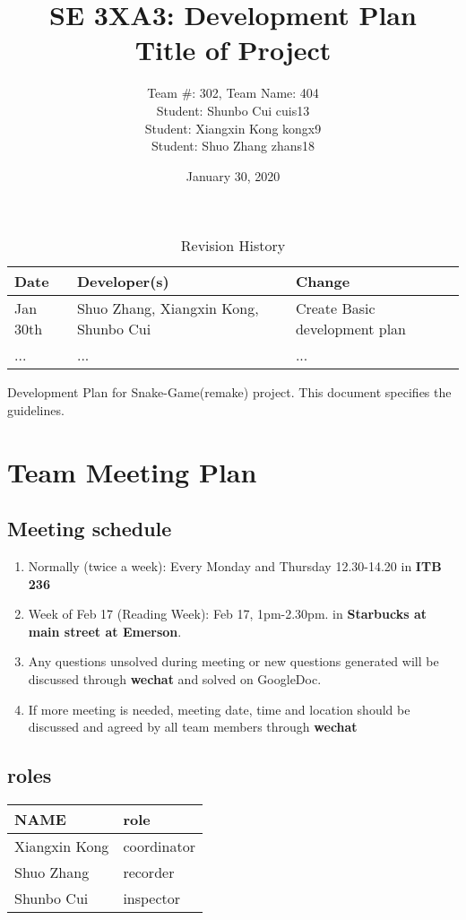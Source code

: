\documentclass{article}
\title{SE 3XA3: Development Plan\\Title of Project}
\author{Team \#: 302, Team Name: 404
		\\ Student: Shunbo Cui	cuis13
		\\ Student: Xiangxin Kong	kongx9
		\\ Student: Shuo Zhang	zhans18
}
\date{January 30, 2020}
\begin{document}
\begin{table}[hp]
\caption{Revision History} \label{TblRevisionHistory}
\begin{tabularx}{\textwidth}{llX}
\toprule
\textbf{Date} & \textbf{Developer(s)} & \textbf{Change}\\
\midrule
Jan 30th & Shuo Zhang, Xiangxin Kong, Shunbo Cui & Create Basic development plan\\
... & ... & ...\\
\bottomrule
\end{tabularx}
\end{table}

\newpage

\maketitle

Development Plan for Snake-Game(remake) project. This document specifies the guidelines.

\section{Team Meeting Plan}
\subsection{Meeting schedule}
\begin{enumerate}
    \item Normally (twice a week): Every Monday and Thursday  12.30-14.20 in \textbf{ITB 236}
    \item Week of Feb 17 (Reading Week): Feb 17, 1pm-2.30pm. in \textbf{Starbucks at main street at Emerson}.
	\item Any questions unsolved during meeting or new questions generated will be discussed through \textbf{wechat} and solved on GoogleDoc.
    \item If more meeting is needed, meeting date, time and location should be discussed and agreed by all team members through \textbf{wechat}
\end{enumerate}
\subsection{roles}
    
    \begin{tabular}{ |l|l| }
        \toprule
        \textbf{NAME} & \textbf{role} \\
        \midrule
        Xiangxin Kong & coordinator \\
        \midrule
        Shuo Zhang & recorder \\
        \midrule
        Shunbo Cui & inspector \\
        \bottomrule
    \end{tabular}
\end{document}
